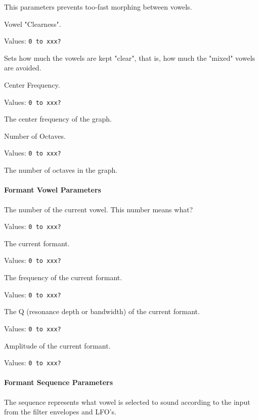    This parameters prevents too-fast morphing between vowels.

   Vowel "Clearness".

   Values:  \texttt{0 to xxx?}

   Sets how much the vowels are kept "clear",
   that is, how much the "mixed" vowels are avoided.

   Center Frequency.

   Values:  \texttt{0 to xxx?}

   The center frequency of the graph.

   Number of Octaves.

   Values:  \texttt{0 to xxx?}

   The number of octaves in the graph.

\paragraph{Formant Vowel Parameters}
\label{paragraph:formant_vowel_parameters}

   The number of the current vowel.
   This number means what?

   Values:  \texttt{0 to xxx?}

   The current formant.

   Values:  \texttt{0 to xxx?}

   The frequency of the current formant.

   Values:  \texttt{0 to xxx?}

   The Q (resonance depth or bandwidth) of the current formant.

   Values:  \texttt{0 to xxx?}

   Amplitude of the current formant.

   Values:  \texttt{0 to xxx?}

\paragraph{Formant Sequence Parameters}
\label{paragraph:formant_sequence_parameters}

   The sequence represents what vowel is selected to sound according to the
   input from the filter envelopes and LFO's.
 
